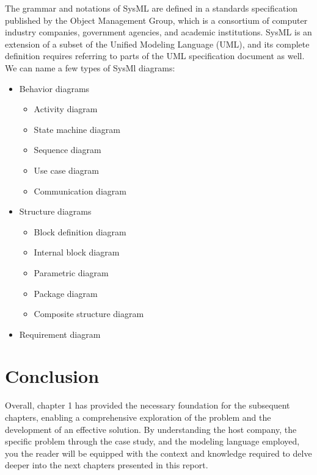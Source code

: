 The grammar and notations of SysML are defined in a standards specification published by the Object Management Group, which is a consortium of computer industry companies, government agencies, and academic institutions. SysML is an extension of a subset of the Unified Modeling Language (UML), and its complete definition requires referring to parts of the UML specification document as well.\cite{LD13}
We can name a few types of SysMl diagrams:
\begin{itemize}
\item Behavior diagrams\cite{LD13}
\begin{itemize}
\item Activity diagram
\item State machine diagram
\item Sequence diagram
\item Use case diagram
\item Communication diagram
\end{itemize}
\item Structure diagrams\cite{LD13}
\begin{itemize}
\item Block definition diagram
\item Internal block diagram
\item Parametric diagram
\item Package diagram
\item Composite structure diagram
\end{itemize}
\item Requirement diagram\cite{LD13}
\end{itemize}
\vspace{1em}


\section{Conclusion}
Overall, chapter 1 has provided the necessary foundation for the subsequent chapters, enabling a comprehensive exploration of the problem and the development of an effective solution. By understanding the host company, the specific problem through the case study, and the modeling language employed, you the  reader will be  equipped with the context and knowledge required to delve deeper into the next chapters presented in this report.




%